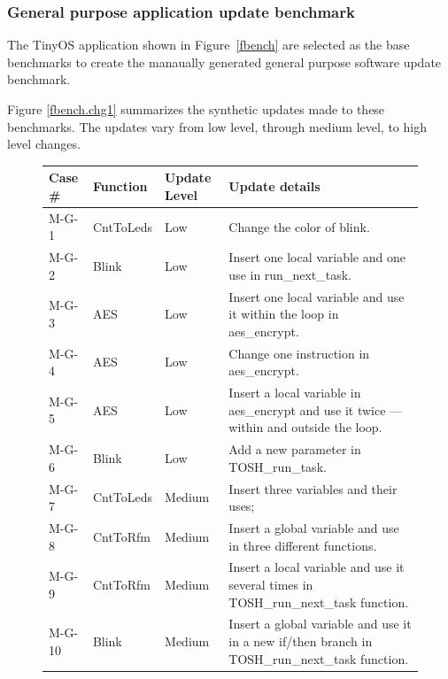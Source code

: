\subsubsection{General purpose application update benchmark}
The TinyOS application shown in Figure~\ref{fbench} are selected as the base benchmarks
to create the manaually generated general purpose software update benchmark.


Figure \ref{fbench.chg1} summarizes the synthetic updates made to these
benchmarks. The updates vary from low level, through medium level, to high level changes.

\begin{figure}[htbp]
\centering
\begin{small}
\begin{tabular}{||p{0.6in}|p{1in}|p{0.5in}|p{3.5in}||} \hline
Case \# & Function & Update Level & Update details \\ \hline \hline

M-G-1 & CntToLeds &Low & Change the color of blink. \\ \hline

M-G-2 & Blink &Low & Insert one local variable and one use in
run\_next\_task. \\ \hline

M-G-3 & AES& Low & Insert one local variable and use it within the
loop in aes\_encrypt. \\ \hline

M-G-4 & AES & Low & Change one instruction in aes\_encrypt. \\ \hline

M-G-5 & AES & Low & Insert a local variable in aes\_encrypt and use it
twice --- within and outside the loop. \\ \hline

M-G-6 & Blink &Low &Add a new parameter in TOSH\_run\_task. \\ \hline

M-G-7 & CntToLeds & Medium & Insert three variables and their uses; \\
\hline

M-G-8 & CntToRfm & Medium & Insert a global variable and use in three
different functions. \\ \hline

M-G-9 & CntToRfm & Medium & Insert a local variable and use it several
times in TOSH\_run\_next\_task function. \\ \hline

M-G-10 & Blink&Medium & Insert a global variable and use it in a new
if/then branch in TOSH\_run\_next\_task function. \\ \hline


\end{tabular}
\end{small}
\end{figure}

